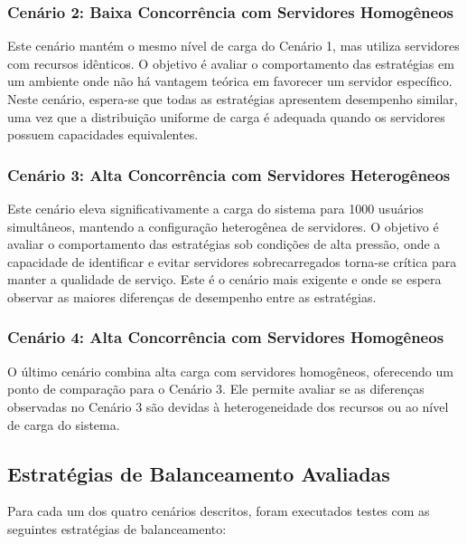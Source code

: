 \subsubsection{Cenário 2: Baixa Concorrência com Servidores Homogêneos}

Este cenário mantém o mesmo nível de carga do Cenário 1, mas utiliza servidores com recursos idênticos. O objetivo é avaliar o comportamento das estratégias em um ambiente onde não há vantagem teórica em favorecer um servidor específico. Neste cenário, espera-se que todas as estratégias apresentem desempenho similar, uma vez que a distribuição uniforme de carga é adequada quando os servidores possuem capacidades equivalentes.

\subsubsection{Cenário 3: Alta Concorrência com Servidores Heterogêneos}

Este cenário eleva significativamente a carga do sistema para 1000 usuários simultâneos, mantendo a configuração heterogênea de servidores. O objetivo é avaliar o comportamento das estratégias sob condições de alta pressão, onde a capacidade de identificar e evitar servidores sobrecarregados torna-se crítica para manter a qualidade de serviço. Este é o cenário mais exigente e onde se espera observar as maiores diferenças de desempenho entre as estratégias.

\subsubsection{Cenário 4: Alta Concorrência com Servidores Homogêneos}

O último cenário combina alta carga com servidores homogêneos, oferecendo um ponto de comparação para o Cenário 3. Ele permite avaliar se as diferenças observadas no Cenário 3 são devidas à heterogeneidade dos recursos ou ao nível de carga do sistema.

\subsection{Estratégias de Balanceamento Avaliadas}

Para cada um dos quatro cenários descritos, foram executados testes com as seguintes estratégias de balanceamento:

